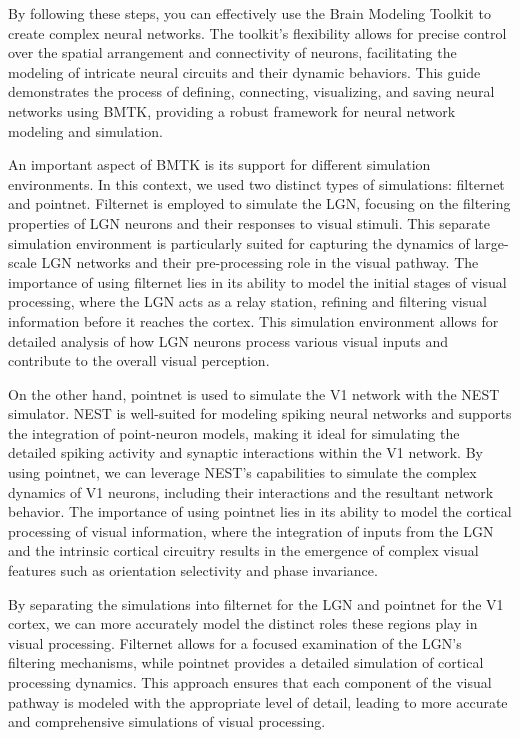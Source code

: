 \documentclass[12pt]{article}
\begin{document}
By following these steps, you can effectively use the Brain Modeling Toolkit to create complex neural networks. The toolkit's flexibility allows for precise control over the spatial arrangement and connectivity of neurons, facilitating the modeling of intricate neural circuits and their dynamic behaviors. This guide demonstrates the process of defining, connecting, visualizing, and saving neural networks using BMTK, providing a robust framework for neural network modeling and simulation.

An important aspect of BMTK is its support for different simulation environments. In this context, we used two distinct types of simulations: filternet and pointnet. Filternet is employed to simulate the LGN, focusing on the filtering properties of LGN neurons and their responses to visual stimuli. This separate simulation environment is particularly suited for capturing the dynamics of large-scale LGN networks and their pre-processing role in the visual pathway. The importance of using filternet lies in its ability to model the initial stages of visual processing, where the LGN acts as a relay station, refining and filtering visual information before it reaches the cortex. This simulation environment allows for detailed analysis of how LGN neurons process various visual inputs and contribute to the overall visual perception.

On the other hand, pointnet is used to simulate the V1 network with the NEST simulator. NEST is well-suited for modeling spiking neural networks and supports the integration of point-neuron models, making it ideal for simulating the detailed spiking activity and synaptic interactions within the V1 network. By using pointnet, we can leverage NEST's capabilities to simulate the complex dynamics of V1 neurons, including their interactions and the resultant network behavior. The importance of using pointnet lies in its ability to model the cortical processing of visual information, where the integration of inputs from the LGN and the intrinsic cortical circuitry results in the emergence of complex visual features such as orientation selectivity and phase invariance.

By separating the simulations into filternet for the LGN and pointnet for the V1 cortex, we can more accurately model the distinct roles these regions play in visual processing. Filternet allows for a focused examination of the LGN's filtering mechanisms, while pointnet provides a detailed simulation of cortical processing dynamics. This approach ensures that each component of the visual pathway is modeled with the appropriate level of detail, leading to more accurate and comprehensive simulations of visual processing.
\end{document}
